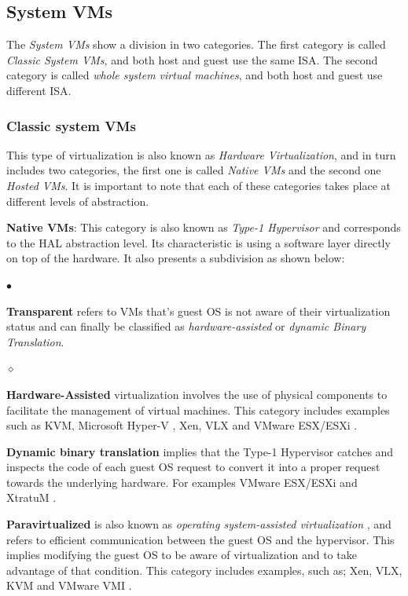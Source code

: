 	\subsection{System VMs}
	
	The \textit{System VMs} show a division in two categories.  The first category is called \textit{Classic System VMs}, and both host and guest use the same ISA. The second category is called \textit{whole system virtual machines}, and both host and guest use different ISA.
	
	\subsubsection{Classic system VMs} This type of virtualization is also known as \textit{Hardware Virtualization}, and in turn includes two categories, the first one is called \textit{Native VMs} and the second one \textit{Hosted VMs}. It is important to note that each of these categories takes place at different levels of abstraction.
	
	\textbf{Native VMs}: This category is also known as \textit{Type-1 Hypervisor} and corresponds to the HAL abstraction level. Its characteristic is using a software layer directly on top of the hardware. It also presents a subdivision as shown below:
		
	\begin{list}{$\bullet$}{\setlength{\leftmargin}{5pt}}

			\item \textbf {Transparent} refers to VMs that's guest OS is not aware of their virtualization status and can finally be classified as \textit{hardware-assisted} or \textit{dynamic Binary Translation}.
			
			\begin{list}{$\diamond$}{\setlength{\leftmargin}{8pt}}

				\item \textbf{Hardware-Assisted} virtualization involves the use of physical components to facilitate the management of virtual machines. This category includes examples such as KVM, Microsoft Hyper-V \cite{Kappel2009}, Xen, VLX and VMware ESX/ESXi \cite{VMware2018Website}.
				
				\item \textbf{Dynamic binary translation} implies that the Type-1 Hypervisor catches and inspects the code of each guest OS request to convert it into a proper request towards the underlying hardware. For examples VMware ESX/ESXi and XtratuM \cite{XtratuM}.
				 
			\end{list}
			
			\item \textbf{Paravirtualized} is also known as \textit{operating system-assisted virtualization} \cite{VMware2008}, \cite{VMware2018Website} and refers to efficient communication between the guest OS and the hypervisor. This implies modifying the guest OS to be aware of virtualization and to take advantage of that condition. This category includes examples, such as; Xen, VLX, KVM and VMware VMI \cite{VMware2018Website}.
			
		\end{list}	
		
